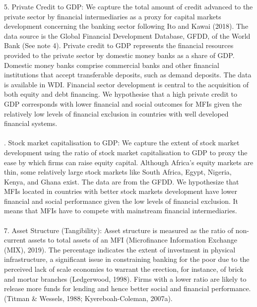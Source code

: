 \documentclass[a4paper, nobind]{templates/ociamthesis}
\begin{document}
\begin{table}
\begin{tabu}
5. Private Credit to GDP: We capture the total amount of credit advanced to the private sector by financial intermediaries as a proxy for capital markets development concerning the banking sector following Ito and Kawai (2018). The data source is the Global Financial Development Database, GFDD, of the World Bank (See note 4). Private credit to GDP represents the financial resources provided to the private sector by domestic money banks as a share of GDP. Domestic money banks comprise commercial banks and other financial institutions that accept transferable deposits, such as demand deposits. The data is available in WDI. Financial sector development is central to the acquisition of both equity and debt financing. We hypothesise that a high private credit to GDP corresponds with lower financial and social outcomes for MFIs given the relatively low levels of financial exclusion in countries with well developed financial systems.\\
\\
. Stock market capitalisation to GDP: We capture the extent of stock market development using the ratio of stock market capitalisation to GDP to proxy the ease by which firms can raise equity capital. Although Africa's equity markets are thin, some relatively large stock markets like South Africa, Egypt, Nigeria, Kenya, and Ghana exist. The data are from the GFDD. We hypothesize that MFIs located in countries with better stock markets development have lower financial and social performance given the low levels of financial exclusion. It means that MFIs have to compete with mainstream financial intermediaries.\\
\\
7. Asset Structure (Tangibility): Asset structure is measured as the ratio of non-current assets to total assets of an MFI (Microfinance Information Exchange (MIX), 2019). The percentage indicates the extent of investment in physical infrastructure, a significant issue in constraining banking for the poor due to the perceived lack of scale economies to warrant the erection, for instance, of brick and mortar branches (Ledgerwood, 1998). Firms with a lower ratio are likely to release more funds for lending and hence better social and financial performance. (Titman \& Wessels, 1988; Kyereboah-Coleman, 2007a).\\
\\
\bottomrule
{}\\
\\

\end{tabu}
\end{table}
\end{document}
